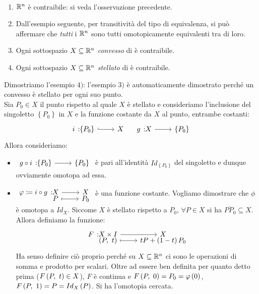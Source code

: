 \begin{examples}~{}
	\begin{enumerate}
		\item $\mathbb{R}^n$ è contraibile: si veda l'osservazione precedente.
		\item Dall'esempio seguente, per transitività del tipo di equivalenza, si può affermare che \textit{tutti} i $\mathbb{R}^n$ sono tutti omotopicamente equivalenti tra di loro.
		\item Ogni sottospazio $X\subseteq \mathbb{R}^n$ \textit{convesso} di è contraibile.
		\item Ogni sottospazio $X\subseteq \mathbb{R}^n$ \textit{stellato} di è contraibile.
	\end{enumerate}
\end{examples}
\begin{demonstration}
	Dimostriamo l'esempio $4)$: l'esempio $3)$ è automaticamente dimostrato perché un convesso è stellato per ogni suo punto.\\
	Sia $P_0\in X$ il punto rispetto al quale $X$ è stellato e consideriamo l'inclusione del singoletto $\left\{P_0\right\}$ in $X$ e la funzione costante da $X$ al punto, entrambe costanti:
	\begin{equation*}
		\incl{i}{\left\{P_0\right\}}{X}\quad \funz{g}{X}{\left\{P_0\right\}}
	\end{equation*}
Allora consideriamo:
\begin{itemize}
	\item $\funz{g\circ i}{\left\{P_0\right\}}{\left\{P_0\right\}}$ è pari all'identità $Id_{\left\{P_0\right\}}$ del singoletto e dunque ovviamente omotopa ad essa.
	\item $\funztot{\phi\coloneqq i\circ g}{X}{X}{P}{P_0}$ è una funzione costante. Vogliamo dimostrare che $\phi$ è omotopa a $Id_X$. Siccome $X$ è stellato rispetto a $P_0$, $\forall P\in X$ si ha $\overline{PP_0}\subseteq X$. Allora definiamo la funzione:
	\begin{equation*}
		\funztot{F}{X\times I}{X}{\left(P,\ t\right)}{tP+\left(1-t\right)P_0}
	\end{equation*}
Ha senso definire ciò proprio perché su $X\subseteq \mathbb{R}^n$ ci sono le operazioni di somma e prodotto per scalari. Oltre ad essere ben definita per quanto detto prima ($F\left(P,\ t\right)\in X$), $F$ è continua e $F\left(P,\ 0\right)=P_0=\varphi\left(0\right)$, $F\left(P,\ 1\right)=P=Id_X\left(P\right)$. Si ha l'omotopia cercata.
\end{itemize}
\end{demonstration}
